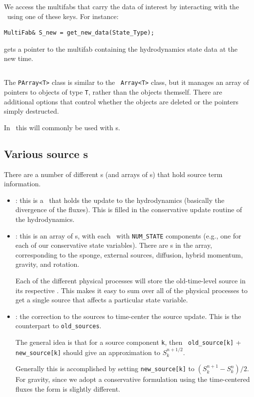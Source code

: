 We access the multifabs that carry the data of interest by interacting
with the \statedata\ using one of these keys.  For instance:
\begin{lstlisting}
MultiFab& S_new = get_new_data(State_Type);
\end{lstlisting}
gets a pointer to the multifab containing the hydrodynamics state data
at the new time.



\subsection{\code{\parray}}

The {\tt PArray<T>} class is similar to the \cpp\ {\tt Array<T>} class,
but it manages an array of pointers to objects of type {\tt T}, rather
than the objects themself.  There are additional options that control
whether the objects are deleted or the pointers simply destructed.

In \castro\, this will commonly be used with \multifab s.


\subsection{Various source \multifab s}

There are a number of different \multifab s (and arrays of \multifab s)
that hold source term information.

\begin{itemize}

\item {} : this is a \multifab\ that holds the
  update to the hydrodynamics (basically the divergence of the
  fluxes).  This is filled in the conservative update routine of the
  hydrodynamics.

\item {} : this is an array of \multifab s, with
  each \multifab\ with {\tt NUM\_STATE} components (e.g., one for each
  of our conservative state variables).  There are 
  \multifab s in the array, corresponding to the sponge, external
  sources, diffusion, hybrid momentum, gravity, and rotation.

  Each of the different physical processes will store the
  old-time-level source in its respective \multifab.  This makes it
  easy to sum over all of the physical processes to get a single
  source that affects a particular state variable.

\item {} : the correction to the sources to
  time-center the source update.  This is the counterpart to
  {\tt old\_sources}.

  The general idea is that for a source component {\tt k}, then {\tt
    old\_source[k]} + {\tt new\_source[k]} should give an approximation
  to $S_k^{n+1/2}$.

  Generally this is accomplished by setting {\tt new\_source[k]} to
  $(S_k^{n+1} - S_k^{n})/2$.  For gravity, since we adopt a conservative
  formulation using the time-centered fluxes the form is slightly
  different.

\end{itemize}

